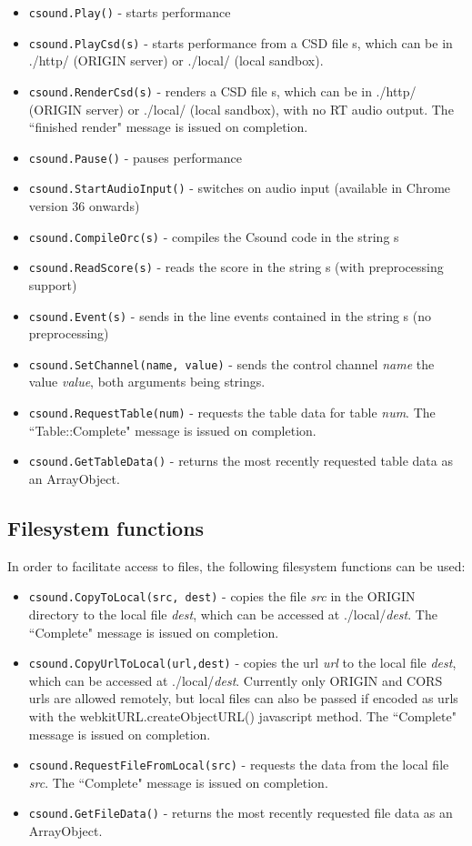 \documentclass[11pt]{article}
\begin{document}
\begin{itemize}
\item {\tt csound.Play()} - starts performance
\item {\tt csound.PlayCsd(s)} - starts performance from a CSD file s, which can be in ./http/ (ORIGIN server) or ./local/ (local sandbox).
\item {\tt csound.RenderCsd(s)} - renders a CSD file s, which can be in ./http/ (ORIGIN server) or ./local/ (local sandbox), with no RT audio output.
The ``finished render" message is issued on completion.
\item {\tt csound.Pause()} - pauses performance
\item  {\tt csound.StartAudioInput()} - switches on audio input
  (available in Chrome version 36 onwards)
\item {\tt csound.CompileOrc(s)} - compiles the Csound code in the string s
\item {\tt csound.ReadScore(s)} - reads the score in the string s (with preprocessing support)
\item {\tt csound.Event(s)} - sends in the line events contained in the string s (no preprocessing)
\item {\tt csound.SetChannel(name, value)} - sends the control channel
  \emph{name} the value \emph{value}, both arguments being strings.
\item {\tt csound.RequestTable(num)} - requests the table data for
  table \emph{num}. The ``Table::Complete" message is issued on completion. 
\item {\tt csound.GetTableData()} - returns the most recently
  requested table data as an ArrayObject. 
\end{itemize}

\subsection{Filesystem functions}

In order to facilitate access to files, the following filesystem functions can be used:

\begin{itemize}
\item {\tt csound.CopyToLocal(src, dest)} - copies the file \emph{src} in the ORIGIN directory to the local file \emph{dest}, which can
be accessed at ./local/\emph{dest}. The ``Complete" message is issued on completion.
\item {\tt csound.CopyUrlToLocal(url,dest)} - copies the url \emph{url} to the local file \emph{dest}, which can
be accessed at ./local/\emph{dest}. Currently only ORIGIN and CORS urls are allowed remotely, but local files can
also be passed if encoded as urls with the webkitURL.createObjectURL() javascript method. The ``Complete" message is issued on completion.
\item {\tt csound.RequestFileFromLocal(src)} - requests the data from the local file \emph{src}. The ``Complete" message is issued on completion. 
\item {\tt csound.GetFileData()} - returns the most recently requested file data as an ArrayObject.
\end{itemize}
\end{document}
